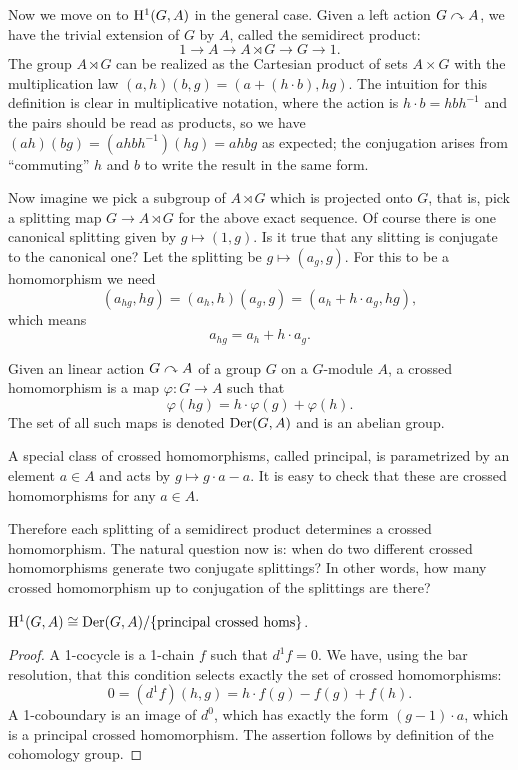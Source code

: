 Now we move on to $\mathrm{H}^1(G,A)$ in the general case. Given a left action $G\curvearrowright A$, we have the trivial extension of $G$ by $A$, called the semidirect product:
\[1\to A\to A\rtimes G \to G\to 1.\]
The group $A\rtimes G$ can be realized as the Cartesian product of sets $A\times G$ with the multiplication law $(a,h)(b,g)=(a+(h\cdot b),hg)$. The intuition for this definition is clear in multiplicative notation, where the action is $h\cdot b=hbh^{-1}$ and the pairs should be read as products, so we have $(ah)(bg)=(ahbh^{-1})(hg)=ahbg$ as expected; the conjugation arises from ``commuting'' $h$  and $b$ to write the result in the same form.

Now imagine we pick a subgroup of $A\rtimes G$ which is projected onto $G$, that is, pick a splitting map $G\to A\rtimes G$ for the above exact sequence. Of course there is one canonical splitting given by $g\mapsto (1,g)$. Is it true that any slitting is conjugate to the canonical one? Let the splitting be $g\mapsto (a_g,g)$. For this to be a homomorphism we need
\[ (a_{hg},hg)=(a_h,h)(a_g,g)=(a_h +h\cdot a_g,hg),\]
which means
\[a_{hg}=a_h + h\cdot a_g.\]

\begin{defn}
    Given an linear action $G\curvearrowright A$ of a group $G$ on a $G$-module $A$, a crossed homomorphism is a map $\varphi:G\to A$ such that 
    \[\varphi(hg)=h\cdot \varphi(g)+\varphi(h).\]
    The set of all such maps is denoted $\operatorname{Der}(G,A)$ and is an abelian group.
\end{defn}
\begin{defn}
    A special class of crossed homomorphisms, called principal, is parametrized by an element $a\in A$ and acts by $g\mapsto g\cdot a-a$. It is easy to check that these are crossed homomorphisms for any $a\in A$.
\end{defn}

Therefore each splitting of a semidirect product determines a crossed homomorphism. The natural question now is: when do two different crossed homomorphisms generate two conjugate splittings? In other words, how many crossed homomorphism up to conjugation of the splittings are there?

\begin{thm}
$\mathrm{H}^1(G,A)\cong \operatorname{Der}(G,A)\slash \{\text{principal crossed homs}\}$.
\end{thm}
\begin{proof}
    A 1-cocycle is a 1-chain $f$ such that $d^1f=0$. We have, using the bar resolution, that this condition selects exactly the set of crossed homomorphisms:
    \[0=(d^1f)(h,g)=h\cdot f(g)-f(g)+f(h).\]
    A 1-coboundary is an image of $d^0$, which has exactly the form $(g-1)\cdot a$, which is a principal crossed homomorphism. The assertion follows by definition of the cohomology group.
\end{proof}


